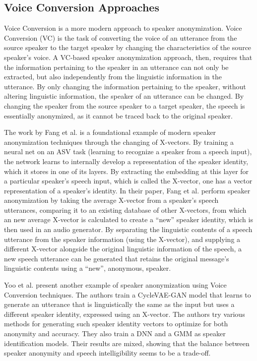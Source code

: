 \documentclass{Interspeech2024}
\begin{document}
\subsection{Voice Conversion Approaches}
Voice Conversion is a more modern approach to speaker anonymization.
Voice Conversion (VC) is the task of converting the voice of an utterance from the source speaker to the target speaker by changing the characteristics of the source speaker's voice.
A VC-based speaker anonymization approach, then, requires that the information pertaining to the speaker in an utterance can not only be extracted, but also independently from the linguistic information in the utterance.
By only changing the information pertaining to the speaker, without altering linguistic information, the speaker of an utterance can be changed.
By changing the speaker from the source speaker to a target speaker, the speech is essentially anonymized, as it cannot be traced back to the original speaker.

The work by Fang et al. \cite{fang_2019_xvector} is a foundational example of modern speaker anonymization techniques through the changing of X-vectors. 
By training a neural net on an ASV task (learning to recognize a speaker from a speech input), the network learns to internally develop a representation of the speaker identity, which it stores in one of its layers. 
By extracting the embedding at this layer for a particular speaker's speech input, which is called the X-vector, one has a vector representation of a speaker's identity.
In their paper, Fang et al. perform speaker anonymization by taking the average X-vector from a speaker's speech utterances, comparing it to an existing database of other X-vectors, from which an new average X-vector is calculated to create a “new” speaker identity, which is then used in an audio generator.
By separating the linguistic contents of a speech utterance from the speaker information (using the X-vector), and supplying a different X-vector alongside the original linguistic information of the speech, a new speech utterance can be generated that retains the original message's linguistic contents using a “new”, anonymous, speaker.

Yoo et al. \cite{yoo_2020_voice_conversion} present another example of speaker anonymization using Voice Conversion techniques. 
The authors train a CycleVAE-GAN model that learns to generate an utterance that is linguistically the same as the input but uses a different speaker identity, expressed using an X-vector. 
The authors try various methods for generating such speaker identity vectors to optimize for both anonymity and accuracy. 
They also train a DNN and a GMM as speaker identification models. 
Their results are mixed, showing that the balance between speaker anonymity and speech intelligibility seems to be a trade-off.
\end{document}
